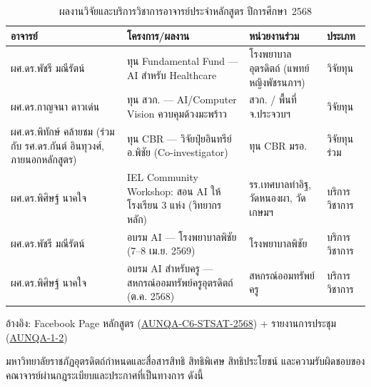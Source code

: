 \begin{table}[H]
  \centering
  \caption{ผลงานวิจัยและบริการวิชาการอาจารย์ประจำหลักสูตร ปีการศึกษา~2568}
  \label{tbl:staff_research_2568}
  \begingroup
  \footnotesize
  \setlength{\tabcolsep}{3pt}
  \renewcommand{\arraystretch}{1.2}
  \begin{tabularx}{\linewidth}{|>{\raggedright\arraybackslash}X|>{\raggedright\arraybackslash}X|>{\raggedright\arraybackslash}X|l|}
    \hline
    \textbf{อาจารย์} & \textbf{โครงการ/ผลงาน} & \textbf{หน่วยงานร่วม} & \textbf{ประเภท} \\
    \hline
    ผศ.ดร.พัชรี มณีรัตน์ & ทุน Fundamental Fund — AI สำหรับ Healthcare & โรงพยาบาลอุตรดิตถ์ (แพทย์หญิงพัชรนภาฯ) & วิจัยทุน \\
    \hline
    ผศ.ดร.กาญจนา ดาวเด่น & ทุน สวก. — AI/Computer Vision ควบคุมด้วงมะพร้าว & สวก. / พื้นที่ จ.ประจวบฯ & วิจัยทุน \\
    \hline
    ผศ.ดร.พิทักษ์ คล้ายชม (ร่วมกับ รศ.ดร.กันต์ อินทุวงศ์, ภายนอกหลักสูตร) & ทุน CBR — วิจัยปุ๋ยอินทรีย์ อ.พิชัย (Co-investigator) & ทุน CBR มรอ. & วิจัยทุนร่วม \\
    \hline
    ผศ.ดร.พิศิษฐ์ นาคใจ & IEL Community Workshop: สอน AI ให้โรงเรียน 3 แห่ง (วิทยากรหลัก) & รร.เทศบาลท่าอิฐ, วัดหนองผา, วัดเกษมฯ & บริการวิชาการ \\
    \hline
    ผศ.ดร.พัชรี มณีรัตน์ & อบรม AI — โรงพยาบาลพิชัย (7--8 เม.ย. 2569) & โรงพยาบาลพิชัย & บริการวิชาการ \\
    \hline
    ผศ.ดร.พิศิษฐ์ นาคใจ & อบรม AI สำหรับครู — สหกรณ์ออมทรัพย์ครูอุตรดิตถ์ (ต.ค. 2568) & สหกรณ์ออมทรัพย์ครู & บริการวิชาการ \\
    \hline
  \end{tabularx}
  \endgroup
  \begin{flushleft}
    \footnotesize อ้างอิง: Facebook Page หลักสูตร (\hyperlink{ref:AUNQA-C6-STSAT-2568}{AUNQA-C6-STSAT-2568}) + รายงานการประชุม (\hyperlink{ref:AUNQA-1-2}{AUNQA-1-2})
  \end{flushleft}
\end{table}


มหาวิทยาลัยราชภัฏอุตรดิตถ์กำหนดและสื่อสารสิทธิ สิทธิพิเศษ สิทธิประโยชน์ และความรับผิดชอบของคณาจารย์ผ่านกฎระเบียบและประกาศที่เป็นทางการ ดังนี้

